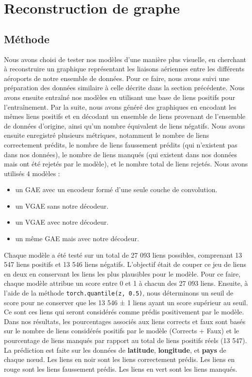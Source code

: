 \documentclass{article}
\begin{document}
\section{Reconstruction de graphe}
\subsection{Méthode}
Nous avons choisi de tester nos modèles d'une manière plus visuelle, en cherchant à reconstruire un graphique représentant les liaisons aériennes entre les différents aéroports de notre ensemble de données. Pour ce faire, nous avons suivi une préparation des données similaire à celle décrite dans la section précédente. Nous avons ensuite entraîné nos modèles en utilisant une base de liens positifs pour l'entraînement. Par la suite, nous avons généré des graphiques en encodant les mêmes liens positifs et en décodant un ensemble de liens provenant de l'ensemble de données d'origine, ainsi qu'un nombre équivalent de liens négatifs. Nous avons ensuite enregistré plusieurs métriques, notamment le nombre de liens correctement prédits, le nombre de liens faussement prédits (qui n'existent pas dans nos données), le nombre de liens manqués (qui existent dans nos données mais ont été rejetés par le modèle), et le nombre total de liens rejetés.
Nous avons utilisés 4 modèles :
\begin{itemize}
    \item un GAE avec un encodeur formé d’une seule couche de convolution.
    \item un VGAE sans notre décodeur.
    \item un VGAE avec notre décodeur.
    \item un même GAE mais avec notre décodeur.
\end{itemize}

Chaque modèle a été testé sur un total de 27 093 liens possibles, comprenant 13 547 liens positifs et 13 546 liens négatifs. L'objectif était de couper ce jeu de liens en deux en conservant les liens les plus plausibles pour le modèle. Pour ce faire, chaque modèle attribue un score entre 0 et 1 à chacun des 27 093 liens. Ensuite, à l'aide de la méthode \texttt{torch.quantile(z, 0.5)}, nous déterminons un seuil de score pour ne conserver que les 13 546 ± 1 liens ayant un score supérieur au seuil. Ce sont ces liens qui seront considérés comme prédis positivement par le modèle. Dans nos résultats, les pourcentages associés aux liens corrects et faux sont basés sur le nombre de liens considérés positifs par le modèle (Corrects + Faux) et le pourcentage de liens manqués par rapport au total de liens positifs réels (13 547).
La prédiction est faite sur les données de \textbf{latitude}, \textbf{longitude},  et \textbf{pays} de chaque nœud.\newline
\newline
Les liens en noir sont les liens correctement prédis.\newline
Les liens en rouge sont les liens faussement prédis.\newline
Les liens en vert sont les liens manqués.
\end{document}
